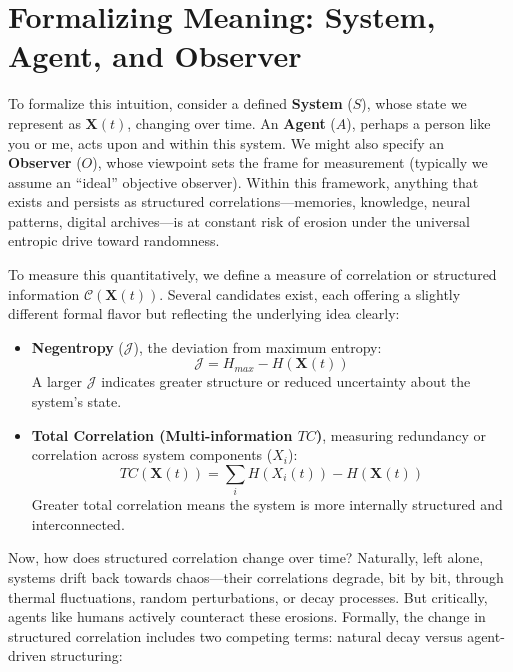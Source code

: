 \section{Formalizing Meaning: System, Agent, and Observer}

To formalize this intuition, consider a defined \textbf{System} ($S$), whose state we represent as $\mathbf{X}(t)$, changing over time. An \textbf{Agent} ($A$), perhaps a person like you or me, acts upon and within this system. We might also specify an \textbf{Observer} ($O$), whose viewpoint sets the frame for measurement (typically we assume an ``ideal'' objective observer). Within this framework, anything that exists and persists as structured correlations---memories, knowledge, neural patterns, digital archives---is at constant risk of erosion under the universal entropic drive toward randomness.

To measure this quantitatively, we define a measure of correlation or structured information $\mathcal{C}(\mathbf{X}(t))$. Several candidates exist, each offering a slightly different formal flavor but reflecting the underlying idea clearly:

\begin{itemize}
    \item \textbf{Negentropy} ($\mathcal{J}$), the deviation from maximum entropy:
    \begin{equation*}
        \mathcal{J} = H_{max} - H(\mathbf{X}(t))
    \end{equation*}
    A larger $\mathcal{J}$ indicates greater structure or reduced uncertainty about the system’s state.
    \item \textbf{Total Correlation (Multi-information $TC$)}, measuring redundancy or correlation across system components ($X_i$):
    \begin{equation*}
        TC(\mathbf{X}(t)) = \sum_i H(X_i(t)) - H(\mathbf{X}(t))
    \end{equation*}
    Greater total correlation means the system is more internally structured and interconnected.
\end{itemize}

Now, how does structured correlation change over time? Naturally, left alone, systems drift back towards chaos---their correlations degrade, bit by bit, through thermal fluctuations, random perturbations, or decay processes. But critically, agents like humans actively counteract these erosions. Formally, the change in structured correlation includes two competing terms: natural decay versus agent-driven structuring:

